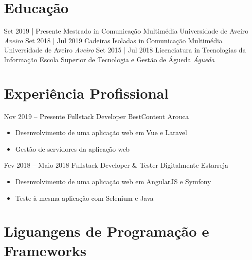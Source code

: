 \documentclass[letterpaper]{moderncv}        %
\begin{document}
\makecvtitle
    

\section{Educação}
\cventry
{Set 2019 | Presente}
{Mestrado in Comunicação Multimédia}
{Universidade de Aveiro}
{}
{\textit{Aveiro}}
{}
\cventry
{Set 2018 | Jul 2019}
{Cadeiras Isoladas in Comunicação Multimédia}
{Universidade de Aveiro}
{}
{\textit{Aveiro}}
{}
\cventry
{Set 2015 | Jul 2018}
{Licenciatura in Tecnologias da Informação}
{Escola Superior de Tecnologia e Gestão de Águeda}
{}
{\textit{Águeda}}
{}
\section{Experiência Profissional}
\cventry
{Nov 2019 -- Presente}
{Fullstack Developer}
{BestContent}
{Arouca}
{}
{\begin{itemize}%
	\item Desenvolvimento de uma aplicação web em Vue e Laravel
	\item Gestão de servidores da aplicação web
	\end{itemize}}
\cventry
{Fev 2018 -- Maio 2018}
{Fullstack Developer \& Tester}
{Digitalmente}
{Estarreja}
{}
{\begin{itemize}%
	\item Desenvolvimento de uma aplicação web em AngularJS e Symfony
	\item Teste à mesma aplicação com Selenium e Java
	\end{itemize}}
\section{Liguangens de Programação e Frameworks}


\ 
\end{document}
